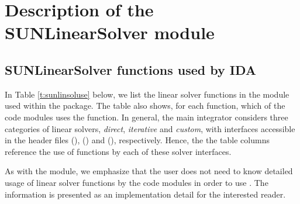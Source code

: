 \chapter{Description of the SUNLinearSolver module}\label{s:sunlinsol}



\section{SUNLinearSolver functions used by IDA}

In Table \ref{t:sunlinsoluse} below, we list the linear solver
functions in the {\sunlinsol} module used within the {\ida} package.
The table also shows, for each function, which of the code modules uses
the function.  In general, the main {\ida} integrator considers
three categories of linear solvers, \emph{direct}, \emph{iterative}
and \emph{custom}, with interfaces accessible in the {\ida} header
files  ({\idadls}), 
({\idaspils}) and  ({\idacls}), respectively.
Hence, the the table columns reference the use of {\sunlinsol}
functions by each of these solver interfaces.

As with the {\sunmatrix} module, we emphasize that the {\ida} user
does not need to know detailed usage of linear solver functions by the
{\ida} code modules in order to use {\ida}. The information is
presented as an implementation detail for the interested reader.

